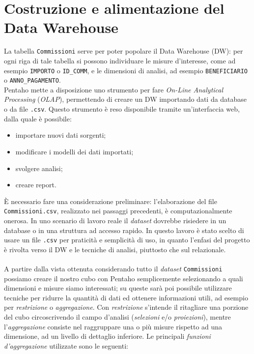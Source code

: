 \chapter{Costruzione e alimentazione del Data Warehouse} \label{chap:DW}

	La tabella \texttt{Commissioni} serve per poter popolare il Data Warehouse (DW): per ogni riga di tale tabella si possono individuare le misure d'interesse, come ad esempio \texttt{IMPORTO} o \texttt{ID\_COMM}, e le dimensioni di analisi, ad esempio \texttt{BENEFICIARIO} o \texttt{ANNO\_PAGAMENTO}.\\
	Pentaho mette a disposizione uno strumento per fare \textit{On-Line Analytical Processing} (\textit{OLAP}), permettendo di creare un DW importando dati da database o da file \texttt{.csv}. Questo strumento è reso disponibile tramite un'interfaccia web, dalla quale è possibile:
	
	\begin{itemize}
	    \item importare nuovi dati sorgenti;
	    \item modificare i modelli dei dati importati;
	    \item svolgere analisi;
	    \item creare report.
	\end{itemize}
	
	È necessario fare una considerazione preliminare: l'elaborazione del file \texttt{Commissioni.csv}, realizzato nei passaggi precedenti, è computazionalmente onerosa. In uno scenario di lavoro reale il \textit{dataset} dovrebbe risiedere in un database o in una struttura ad accesso rapido. In questo lavoro è stato scelto di usare un file \texttt{.csv} per praticità e semplicità di uso, in quanto l'enfasi del progetto è rivolta verso il DW e le tecniche di analisi, piuttosto che sul relazionale.\\
	\\
	A partire dalla vista ottenuta considerando tutto il \textit{dataset} \texttt{Commissioni} possiamo creare il nostro cubo con Pentaho semplicemente selezionando a quali dimensioni e misure siamo interessati; su queste sarà poi possibile utilizzare tecniche per ridurre la quantità di dati ed ottenere informazioni utili, ad esempio per \textit{restrizione} o \textit{aggregazione}. Con \textit{restrizione} s'intende il ritagliare una porzione del cubo circoscrivendo il campo d'analisi (\textit{selezioni} e/o \textit{proiezioni}), mentre l'\textit{aggregazione} consiste nel raggruppare una o più misure rispetto ad una dimensione, ad un livello di dettaglio inferiore. Le principali \textit{funzioni d'aggregazione} utilizzate sono le seguenti:
	
